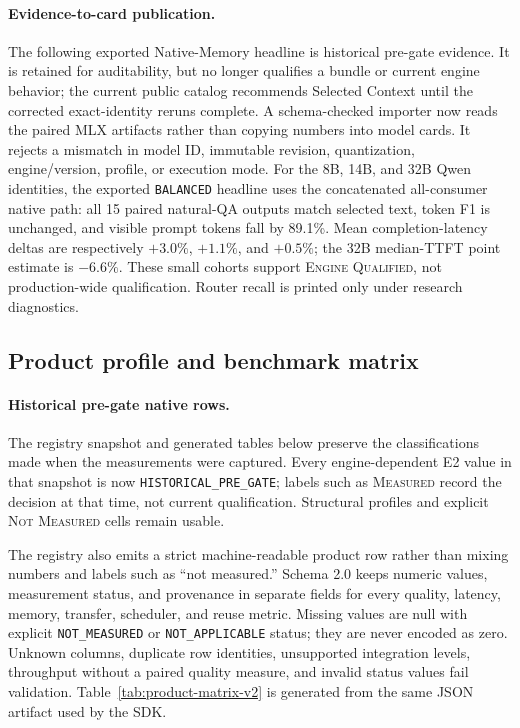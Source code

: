 \documentclass[11pt]{article}
\begin{document}
\paragraph{Evidence-to-card publication.}
The following exported Native-Memory headline is historical pre-gate evidence.
It is retained for auditability, but no longer qualifies a bundle or current
engine behavior; the current public catalog recommends Selected Context until
the corrected exact-identity reruns complete.
A schema-checked importer now reads the paired MLX artifacts rather than
copying numbers into model cards. It rejects a mismatch in model ID, immutable
revision, quantization, engine/version, profile, or execution mode. For the
8B, 14B, and 32B Qwen identities, the exported \texttt{BALANCED} headline uses
the concatenated all-consumer native path: all 15 paired natural-QA outputs
match selected text, token F1 is unchanged, and visible prompt tokens fall by
89.1\%. Mean completion-latency deltas are respectively $+3.0\%$, $+1.1\%$,
and $+0.5\%$; the 32B median-TTFT point estimate is $-6.6\%$. These small
cohorts support \textsc{Engine Qualified}, not production-wide qualification.
Router recall is printed only under research diagnostics.

\subsection{Product profile and benchmark matrix}

\paragraph{Historical pre-gate native rows.}
The registry snapshot and generated tables below preserve the classifications
made when the measurements were captured. Every engine-dependent E2 value in
that snapshot is now \texttt{HISTORICAL\_PRE\_GATE}; labels such as
\textsc{Measured} record the decision at that time, not current qualification.
Structural profiles and explicit \textsc{Not Measured} cells remain usable.

The registry also emits a strict machine-readable product row rather than
mixing numbers and labels such as ``not measured.'' Schema 2.0 keeps numeric
values, measurement status, and provenance in separate fields for every
quality, latency, memory, transfer, scheduler, and reuse metric. Missing values
are null with explicit \texttt{NOT\_MEASURED} or \texttt{NOT\_APPLICABLE}
status; they are never encoded as zero. Unknown columns, duplicate row
identities, unsupported integration levels, throughput without a paired
quality measure, and invalid status values fail validation.
Table~\ref{tab:product-matrix-v2} is generated from the
same JSON artifact used by the SDK.
\end{document}
